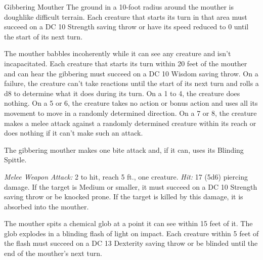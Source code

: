 \documentclass[10pt,a4paper,twoside,bg=print,twocolumn,openany,nodeprecatedcode]{dndbook}
\begin{document}
\begin{DndMonster}[float=t]{Gibbering Mouther}
\DndMonsterBasics[
armor-class = {9},
hit-points = {\DndDice{9d8 + 27}},
speed = {10 ft., swim 10 ft.}
]
\DndMonsterAbilityScores[
 str = 10,
 dex = 8,
 con = 16,
 int = 3,
 wis = 10,
 cha = 6
]
\DndMonsterDetails[
condition-immunities = {prone},
senses = {darkvision 60 ft., passive perception 10},
challenge = 2,
]
The ground in a 10-foot radius around the mouther is doughlike difficult terrain. Each creature that starts its turn in that area must succeed on a DC 10 Strength saving throw or have its speed reduced to 0 until the start of its next turn.

The mouther babbles incoherently while it can see any creature and isn't incapacitated. Each creature that starts its turn within 20 feet of the mouther and can hear the gibbering must succeed on a DC 10 Wisdom saving throw. On a failure, the creature can't take reactions until the start of its next turn and rolls a d8 to determine what it does during its turn. On a 1 to 4, the creature does nothing. On a 5 or 6, the creature takes no action or bonus action and uses all its movement to move in a randomly determined direction. On a 7 or 8, the creature makes a melee attack against a randomly determined creature within its reach or does nothing if it can't make such an attack.

The gibbering mouther makes one bite attack and, if it can, uses its Blinding Spittle.

\textsl{Melee Weapon Attack:} 2 to hit, reach 5 ft., one creature. \textsl{Hit:} 17 (5d6) piercing damage. If the target is Medium or smaller, it must succeed on a DC 10 Strength saving throw or be knocked prone. If the target is killed by this damage, it is absorbed into the mouther.

The mouther spits a chemical glob at a point it can see within 15 feet of it. The glob explodes in a blinding flash of light on impact. Each creature within 5 feet of the flash must succeed on a DC 13 Dexterity saving throw or be blinded until the end of the mouther's next turn.

\end{DndMonster}
\end{document}
